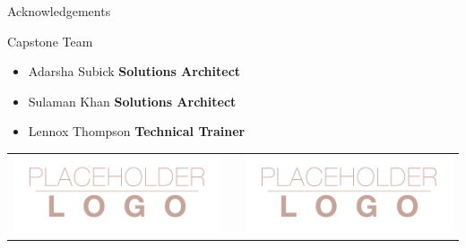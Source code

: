 \documentclass[final]{beamer}
\newlength{\onecolwid}
\begin{document}
\begin{frame}[t]
\begin{columns}[t]
\begin{column}{\onecolwid}
\begin{block}{Acknowledgements}
\end{block}



\begin{alertblock}{Capstone Team}

\begin{itemize}
\item Adarsha Subick \textbf{Solutions Architect}
\item Sulaman Khan \textbf{Solutions Architect}
\item Lennox Thompson \textbf{Technical Trainer}
\end{itemize}

\end{alertblock}

\begin{center}
\begin{tabular}{ccc}
\includegraphics[width=0.4\linewidth]{logo.png} & \hfill & \includegraphics[width=0.4\linewidth]{logo.png}
\end{tabular}
\end{center}


\end{column} %

\end{columns} %

\end{frame} %
\end{document}
